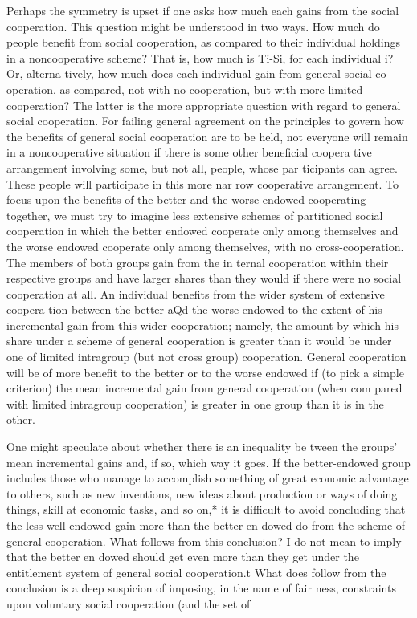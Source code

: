 \documentclass[11pt,openany]{book}
\begin{document}
Perhaps the symmetry is upset if one asks how much each gains from the social cooperation. This question might be understood in two ways. How much do people benefit from social cooperation, as compared to their individual holdings in a noncooperative scheme? That is, how much is Ti-Si, for each individual i? Or, alterna tively, how much does each individual gain from general social co operation, as compared, not with no cooperation, but with more limited cooperation? The latter is the more appropriate question with regard to general social cooperation. For failing general agreement on the principles to govern how the benefits of general social cooperation are to be held, not everyone will remain in a noncooperative situation if there is some other beneficial coopera tive arrangement involving some, but not all, people, whose par ticipants can agree. These people will participate in this more nar row cooperative arrangement. To focus upon the benefits of the better and the worse endowed cooperating together, we must try to imagine less extensive schemes of partitioned social cooperation in which the better endowed cooperate only among themselves and the worse endowed cooperate only among themselves, with no cross-cooperation. The members of both groups gain from the in ternal cooperation within their respective groups and have larger shares than they would if there were no social cooperation at all. An individual benefits from the wider system of extensive coopera tion between the better aQd the worse endowed to the extent of his incremental gain from this wider cooperation; namely, the amount by which his share under a scheme of general cooperation is greater than it would be under one of limited intragroup (but not cross group) cooperation. General cooperation will be of more benefit to the better or to the worse endowed if (to pick a simple criterion) the mean incremental gain from general cooperation (when com pared with limited intragroup cooperation) is greater in one group than it is in the other. 

One might speculate about whether there is an inequality be tween the groups' mean incremental gains and, if so, which way it goes. If the better-endowed group includes those who manage to accomplish something of great economic advantage to others, such as new inventions, new ideas about production or ways of doing things, skill at economic tasks, and so on,* it is difficult to avoid concluding that the less well endowed gain more than the better en dowed do from the scheme of general cooperation. What follows from this conclusion? I do not mean to imply that the better en dowed should get even more than they get under the entitlement system of general social cooperation.t What does follow from the conclusion is a deep suspicion of imposing, in the name of fair ness, constraints upon voluntary social cooperation (and the set of 
\end{document}
